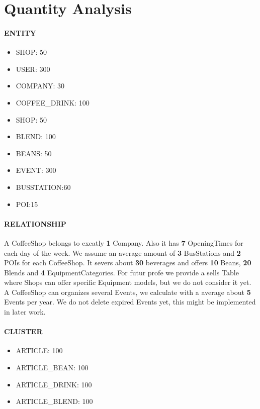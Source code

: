 \section{Quantity Analysis}
\paragraph{ENTITY}
\begin{itemize}
\item SHOP: 50
\item USER: 300
\item COMPANY: 30
\item COFFEE\_DRINK: 100
\item SHOP: 50
\item BLEND: 100
\item BEANS: 50
\item EVENT: 300
\item BUSSTATION:60
\item POI:15

\end{itemize}



\paragraph{RELATIONSHIP}
A CoffeeShop belongs to excatly \textbf{1} Company. Also it has \textbf{7} OpeningTimes for each day of the week. We assume an average amount of \textbf{3} BusStations and \textbf{2} POIs for each CoffeeShop. It severs about \textbf{30} beverages and offers \textbf{10} Beans, \textbf{20} Blends and \textbf{4} EquipmentCategories. For futur profe we provide a sells Table where Shops can offer specific Equipment models, but we do not consider it yet.\\
A CoffeeShop can organizes several Events, we calculate with a average about \textbf{5} Events per year. We do not delete expired Events yet, this might be implemented in later work.
 


\paragraph{CLUSTER}
\begin{itemize}
\item ARTICLE: 100
\item ARTICLE\_BEAN: 100
\item ARTICLE\_DRINK: 100
\item ARTICLE\_BLEND: 100
\end{itemize}

